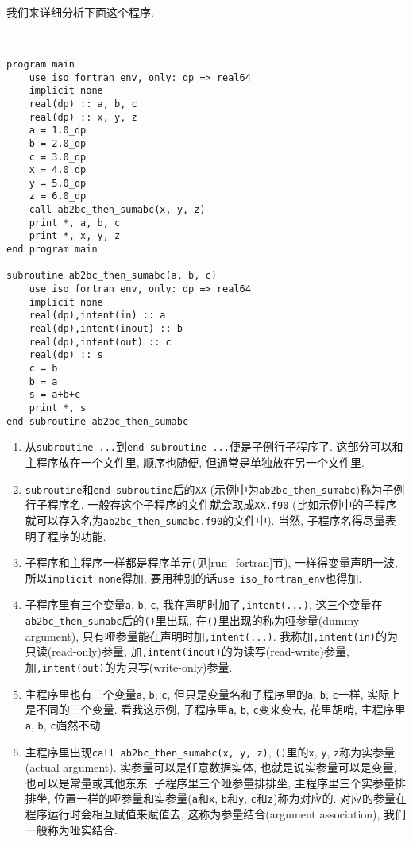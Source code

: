 我们来详细分析下面这个程序.
\begin{verbatim}


program main
    use iso_fortran_env, only: dp => real64
    implicit none
    real(dp) :: a, b, c
    real(dp) :: x, y, z
    a = 1.0_dp
    b = 2.0_dp
    c = 3.0_dp
    x = 4.0_dp
    y = 5.0_dp
    z = 6.0_dp
    call ab2bc_then_sumabc(x, y, z)
    print *, a, b, c
    print *, x, y, z
end program main

subroutine ab2bc_then_sumabc(a, b, c)
    use iso_fortran_env, only: dp => real64
    implicit none
    real(dp),intent(in) :: a
    real(dp),intent(inout) :: b
    real(dp),intent(out) :: c
    real(dp) :: s
    c = b
    b = a
    s = a+b+c
    print *, s
end subroutine ab2bc_then_sumabc
\end{verbatim}
\begin{enumerate}
    \item 从\verb|subroutine ...|到\verb|end subroutine ...|便是子例行子程序了. 这部分可以和主程序放在一个文件里, 顺序也随便, 但通常是单独放在另一个文件里.
    \item \verb|subroutine|和\verb|end subroutine|后的\verb|XX| (示例中为\verb|ab2bc_then_sumabc|)称为子例行子程序名. 一般存这个子程序的文件就会取成\verb|XX.f90| (比如示例中的子程序就可以存入名为\verb|ab2bc_then_sumabc.f90|的文件中). 当然, 子程序名得尽量表明子程序的功能.
    \item 子程序和主程序一样都是程序单元(见\ref{run_fortran}节), 一样得变量声明一波, 所以\verb|implicit none|得加, 要用种别的话\verb|use iso_fortran_env|也得加.
    \item 子程序里有三个变量\verb|a|, \verb|b|, \verb|c|, 我在声明时加了\verb|,intent(...)|, 这三个变量在\verb|ab2bc_then_sumabc|后的\verb|()|里出现, 在\verb|()|里出现的称为哑参量(dummy argument), 只有哑参量能在声明时加\verb|,intent(...)|. 我称加\verb|,intent(in)|的为只读(read-only)参量, 加\verb|,intent(inout)|的为读写(read-write)参量, 加\verb|,intent(out)|的为只写(write-only)参量.
    \item 主程序里也有三个变量\verb|a|, \verb|b|, \verb|c|, 但只是变量名和子程序里的\verb|a|, \verb|b|, \verb|c|一样, 实际上是不同的三个变量. 看我这示例, 子程序里\verb|a|, \verb|b|, \verb|c|变来变去, 花里胡哨, 主程序里\verb|a|, \verb|b|, \verb|c|岿然不动.
    \item 主程序里出现\verb|call ab2bc_then_sumabc(x, y, z)|, \verb|()|里的\verb|x|, \verb|y|, \verb|z|称为实参量(actual argument). 实参量可以是任意数据实体, 也就是说实参量可以是变量, 也可以是常量或其他东东. 子程序里三个哑参量排排坐, 主程序里三个实参量排排坐, 位置一样的哑参量和实参量(\verb|a|和\verb|x|, \verb|b|和\verb|y|, \verb|c|和\verb|z|)称为对应的. 对应的参量在程序运行时会相互赋值来赋值去, 这称为参量结合(argument association), 我们一般称为哑实结合.

\end{enumerate}
